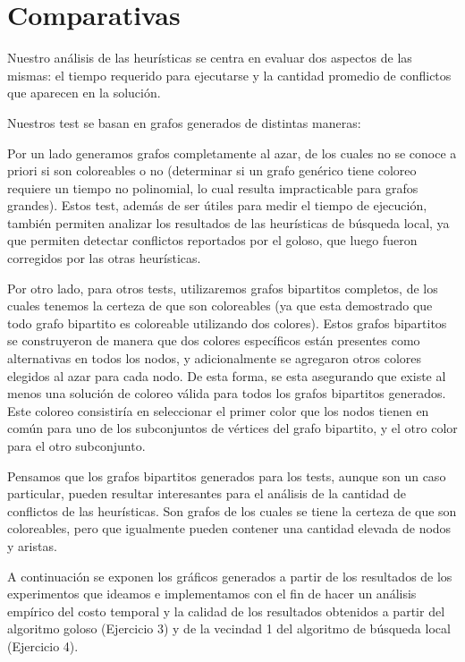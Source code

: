 \section{Comparativas}
Nuestro análisis de las heurísticas se centra en evaluar dos aspectos de las mismas: el tiempo requerido para ejecutarse y la cantidad promedio de conflictos que aparecen en la solución.


Nuestros test se basan en grafos generados de distintas maneras:

Por un lado generamos grafos completamente al azar, de los cuales no se conoce a priori si son coloreables o no (determinar si un grafo genérico tiene coloreo requiere un tiempo no polinomial, lo cual resulta impracticable para grafos grandes). Estos test, además de ser útiles para medir el tiempo de ejecución, también permiten analizar los resultados de las heurísticas de búsqueda local, ya que permiten detectar conflictos reportados por el goloso, que luego fueron corregidos por las otras heurísticas.

Por otro lado, para otros tests, utilizaremos grafos bipartitos completos, de los cuales tenemos la certeza de que son coloreables (ya que esta demostrado que todo grafo bipartito es coloreable utilizando dos colores). Estos grafos bipartitos se construyeron de manera que dos colores específicos están presentes como alternativas en todos los nodos,  y adicionalmente se agregaron otros colores elegidos al azar para cada nodo. De esta forma, se esta asegurando que existe al menos una solución de coloreo válida para todos los grafos bipartitos generados. Este coloreo consistiría en seleccionar el primer color que los nodos tienen en común para uno de los subconjuntos de vértices del grafo bipartito, y el otro color para el otro subconjunto.

Pensamos que los grafos bipartitos generados para los tests, aunque son un caso particular, pueden resultar interesantes para el análisis de la cantidad de conflictos de las heurísticas. Son grafos de los cuales se tiene la certeza de que son coloreables, pero que igualmente pueden contener una cantidad elevada de nodos y aristas.

A continuación se exponen los gráficos generados a partir de los resultados de los experimentos que ideamos e implementamos con el fin de hacer un análisis empírico del costo temporal y la calidad de los resultados obtenidos a partir del algoritmo goloso (Ejercicio 3) y de la vecindad 1 del algoritmo de búsqueda local (Ejercicio 4).

